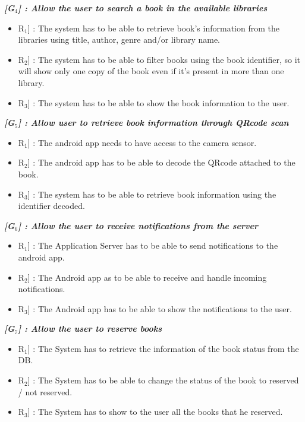 \newpage
\noindent
\emph{\textbf{[G$_{4}$] : Allow the user to search a book in the available libraries}}
\begin{itemize}
	\setlength{\leftskip}{0.5cm}
	\item \lbrack R$_{1}$] : The system has to be able to retrieve book’s information from the libraries using	title, author, genre and/or library name.
	\item \lbrack R$_{2}$] : The system has to be able to filter books using the book identifier, so it will show only one copy of the book even if it's present in more than one library.
	\item \lbrack R$_{3}$] : The system has to be able to show the book information to the user.
\end{itemize}

\vspace{0.5cm}
\noindent
\emph{\textbf{[G$_{5}$] : Allow user to retrieve book information through QRcode scan}}
\begin{itemize}
	\setlength{\leftskip}{0.5cm}
	\item \lbrack R$_{1}$] : The android app needs to have access to the camera sensor.
	\item \lbrack R$_{2}$] : The android app has to be able to decode the QRcode attached to the book.
	\item \lbrack R$_{3}$] : The system has to be able to retrieve book information using the identifier decoded.
\end{itemize}

\vspace{0.5cm}
\noindent
\emph{\textbf{[G$_{6}$] : Allow the user to receive notifications from the server}}
\begin{itemize}
	\setlength{\leftskip}{0.5cm}
	\item \lbrack R$_{1}$] : The Application Server has to be able to send notifications to the android app.
	\item \lbrack R$_{2}$] : The Android app as to be able to receive and handle incoming notifications.
	\item \lbrack R$_{3}$] : The Android app has to be able to show the notifications to the user.
\end{itemize}

\vspace{0.5cm}
\noindent
\emph{\textbf{[G$_{7}$] : Allow the user to reserve books}}
\begin{itemize}
	\setlength{\leftskip}{0.5cm}
	\item \lbrack R$_{1}$] : The System has to retrieve the information of the book status from the DB.
	\item \lbrack R$_{2}$] : The System has to be able to change the status of the book to reserved / not reserved.
	\item \lbrack R$_{3}$] : The System has to show to the user all the books that he reserved.
\end{itemize}

